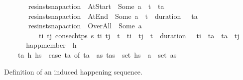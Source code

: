 \begin{isabellebody}
\ \ \ \ \ \ {\isasymor}\ {\isacharparenleft}{\kern0pt}res{\isacharunderscore}{\kern0pt}inst{\isacharunderscore}{\kern0pt}snap{\isacharunderscore}{\kern0pt}action\ {\isasympi}\ At{\isacharunderscore}{\kern0pt}Start\ {\isacharequal}{\kern0pt}\ Some\ a\ {\isasymand}\ t\isactrlsub {\isasympi}\ {\isacharequal}{\kern0pt}\ t\isactrlsub a{\isacharparenright}{\kern0pt}\isanewline
\ \ \ \ \ \ {\isasymor}\ {\isacharparenleft}{\kern0pt}res{\isacharunderscore}{\kern0pt}inst{\isacharunderscore}{\kern0pt}snap{\isacharunderscore}{\kern0pt}action\ {\isasympi}\ At{\isacharunderscore}{\kern0pt}End\ {\isacharequal}{\kern0pt}\ Some\ a\ {\isasymand}\ t\isactrlsub {\isasympi}\ {\isacharplus}{\kern0pt}\ {\isacharparenleft}{\kern0pt}duration\ {\isasympi}{\isacharparenright}{\kern0pt}\ {\isacharequal}{\kern0pt}\ t\isactrlsub a{\isacharparenright}{\kern0pt}\isanewline
\ \ \ \ \ \ {\isasymor}\ {\isacharparenleft}{\kern0pt}res{\isacharunderscore}{\kern0pt}inst{\isacharunderscore}{\kern0pt}snap{\isacharunderscore}{\kern0pt}action\ {\isasympi}\ Over{\isacharunderscore}{\kern0pt}All\ {\isacharequal}{\kern0pt}\ Some\ a\ {\isasymand}\ \isanewline
\ \ \ \ \ \ \ \ \ \ {\isacharparenleft}{\kern0pt}{\isasymexists}t\isactrlsub i\ t\isactrlsub j{\isachardot}{\kern0pt}\ consec{\isacharunderscore}{\kern0pt}htps\ {\isasympi}s\ t\isactrlsub i\ t\isactrlsub j\ {\isasymand}\ t\isactrlsub {\isasympi}\ {\isasymle}\ t\isactrlsub i\ {\isasymand}\ t\isactrlsub j\ {\isasymle}\ t\isactrlsub {\isasympi}\ {\isacharplus}{\kern0pt}\ {\isacharparenleft}{\kern0pt}duration\ {\isasympi}{\isacharparenright}{\kern0pt}\ {\isasymand}\ t\isactrlsub i\ {\isacharless}{\kern0pt}\ t\isactrlsub a\ {\isasymand}\ t\isactrlsub a\ {\isacharless}{\kern0pt}\ t\isactrlsub j{\isacharparenright}{\kern0pt}{\isacharparenright}{\kern0pt}{\isacharparenright}{\kern0pt}{\isachardoublequoteclose}\isanewline
\isanewline
\ \ \isanewline
\ \ \isanewline
\isanewline
\ \ \isamarkupfalse%
\ happ{\isacharunderscore}{\kern0pt}member\ {\isacharparenleft}{\kern0pt}\ {\isachardoublequoteopen}{\isasymin}\isactrlsub h{\isachardoublequoteclose}\ {}{}{\isacharparenright}{\kern0pt}\ \isanewline
\ \ \ \ {\isachardoublequoteopen}ta\ {\isasymin}\isactrlsub h\ hs\ {\isasymequiv}\ {\isacharparenleft}{\kern0pt}case\ ta\ of\ {\isacharparenleft}{\kern0pt}t{\isacharcomma}{\kern0pt}a{\isacharparenright}{\kern0pt}\ {\isasymRightarrow}\ {\isacharparenleft}{\kern0pt}{\isasymexists}as{\isachardot}{\kern0pt}\ {\isacharparenleft}{\kern0pt}t{\isacharcomma}{\kern0pt}as{\isacharparenright}{\kern0pt}\ {\isasymin}\ set\ hs\ {\isasymand}\ a\ {\isasymin}\ set\ as{\isacharparenright}{\kern0pt}{\isacharparenright}{\kern0pt}{\isachardoublequoteclose}%
\begin{isamarkuptext}%
Definition of an induced happening sequence. 


\end{isamarkuptext}
\end{isabellebody}

